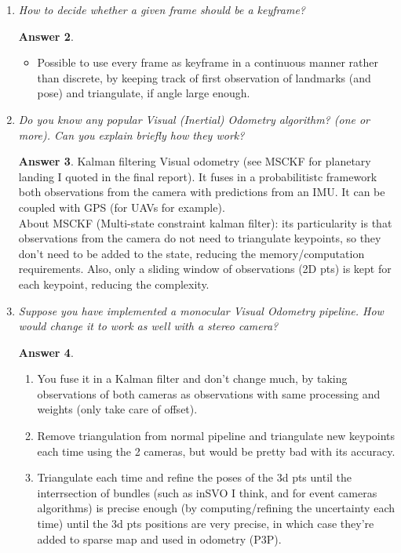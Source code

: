 \documentclass[a4paper,12 pt]{article}
\theoremstyle{definition}
\theoremstyle{remark}
\theoremstyle{definition}
\theoremstyle{definition}
\theoremstyle{definition}
\theoremstyle{definition}
\theoremstyle{remark}
\theoremstyle{remark}
\theoremstyle{definition}
\theoremstyle{definition}
\newtheorem*{answer}{Answer}
\begin{document}
\begin{enumerate}
\begin{answer}
\begin{itemize}
\item For BA, you can optimize only on desired frames.
\item Reduces computational complexity without reducing accuracy.
\end{itemize}
\end{answer}
\item \textit{How to decide whether a given frame should be a keyframe?}
\begin{answer}
\begin{itemize}
\item Possible to use every frame as keyframe in a continuous manner rather than discrete, by keeping track of first observation of landmarks (and pose) and triangulate, if angle large enough.
\end{itemize}
\end{answer}
\item \textit{Do you know any popular Visual (Inertial) Odometry algorithm? (one or more). Can you explain briefly how they work?}
\begin{answer}
Kalman filtering Visual odometry (see MSCKF for planetary landing I quoted in the final report). It fuses in a probabilitistc framework both observations from the camera with predictions from an IMU. It can be coupled with GPS (for UAVs for example).\\
About MSCKF (Multi-state constraint kalman filter): its particularity is that observations from the camera do not need to triangulate keypoints, so they don't need to be added to the state, reducing the memory/computation requirements. Also, only a sliding window of observations (2D pts) is kept for each keypoint, reducing the  complexity.
\end{answer}
\item \textit{Suppose you have implemented a monocular Visual Odometry pipeline. How would change it to work as well with a stereo camera?}
\begin{answer}
\
\begin{enumerate}
\item You fuse it in a Kalman filter and don't change much, by taking observations of both cameras as observations with same processing and weights (only take care of offset).
\item Remove triangulation from normal pipeline and triangulate new keypoints each time using the 2 cameras, but would be pretty bad with its accuracy.
\item Triangulate each time and refine the poses of the 3d pts until the interrsection of bundles (such as inSVO I think, and for event cameras algorithms) is precise enough (by computing/refining the uncertainty each time) until the 3d pts positions are very precise, in which case they're added to sparse map and used in odometry (P3P).
\end{enumerate}
\end{answer}
\end{enumerate}
\newpage
\end{document}
